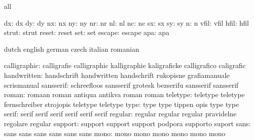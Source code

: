 
\startconstants            all

                       dx: dx
                       dy: dy
                       nx: nx
                       ny: ny
                       nr: nr
                       nl: nl
                       nc: nc
                       sx: sx
                       sy: sy
                        n: n
                     vfil: vfil
                     hfil: hfil
                    strut: strut
                    reset: reset
                      set: set
                   escape: escape
                      apa: apa

\stopconstants




\startvariables            dutch                     english
                           german                    czech
                           italian                   romanian

             calligraphic: calligrafie               calligraphic
                           kalligraphie              kaligraficke
                           calligrafico              caligrafic
              handwritten: handschrift               handwritten
                           handschrift               rukopisne
                           grafiamanuale             scrismanual
                sansserif: schreefloos               sansserif
                           grotesk                   bezserifu
                           sansserif                 sansserif %
                    roman: romaan                    roman
                           antiqua                   antikva
                           roman                     roman %
                 teletype: teletype                  teletype
                           fernschreiber             strojopis
                           teletype                  teletype %
                     type: type                      type
                           tippen                    opis
                           type                      type %
                    serif: serif                     serif
                           serif                     serif
                           serif                     serif %
                  regular: regular                   regular
                           regular                   pravidelne
                           regolare                  regular
                  support: support                   support
                           support                   podpora
                           supporto                  suport
                     sans: sans                      sans
                           sans                      sans
                           sans                      sans
                     mono: mono                      mono
                           mono                      mono
                           mono                      mono

